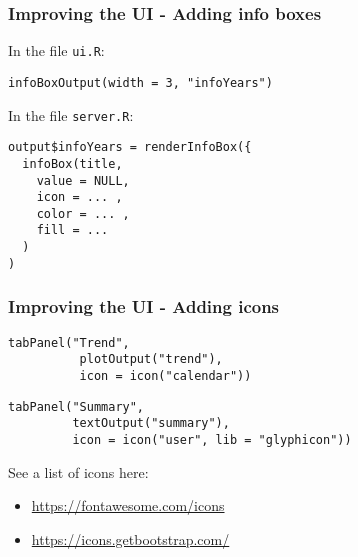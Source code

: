 \documentclass{beamer}
\begin{document}
	\begin{frame}[fragile]
		\frametitle{Improving the UI - Adding info boxes}

		In the file \verb|ui.R|:
		
		\begin{exampleblock}{}
		\begin{BVerbatim}
infoBoxOutput(width = 3, "infoYears")
		\end{BVerbatim}
		\end{exampleblock}{}

		\vspace{1em}

		In the file \verb|server.R|:
		
		\begin{exampleblock}{}
		\begin{BVerbatim}
output$infoYears = renderInfoBox({
  infoBox(title,
    value = NULL,
    icon = ... ,
    color = ... ,
    fill = ...
  )
)
		\end{BVerbatim}
		\end{exampleblock}{}

	\end{frame}


	\begin{frame}[fragile]
		\frametitle{Improving the UI - Adding icons}
		
		\begin{exampleblock}{}
		\begin{BVerbatim}
tabPanel("Trend",
          plotOutput("trend"),
          icon = icon("calendar"))
		\end{BVerbatim}
		\end{exampleblock}{}

		\begin{exampleblock}{}
		\begin{BVerbatim}
tabPanel("Summary",
         textOutput("summary"),
         icon = icon("user", lib = "glyphicon"))
		\end{BVerbatim}
		\end{exampleblock}{}

		\vspace{2em}

		See a list of icons here:
		\begin{itemize}
			\item \href{https://fontawesome.com/icons}{https://fontawesome.com/icons}
			\item \href{https://icons.getbootstrap.com/}{https://icons.getbootstrap.com/}
		\end{itemize}
 	
	\end{frame}
\end{document}
